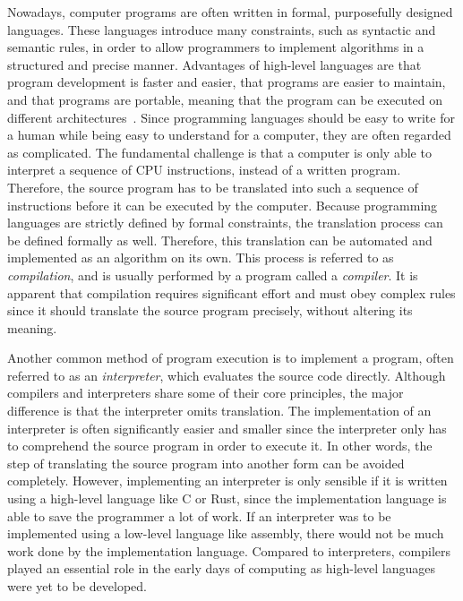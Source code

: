 Nowadays, computer programs are often written in formal, purposefully designed languages.
These languages introduce many constraints, such as syntactic and semantic rules, in order to allow
programmers to implement algorithms in a structured and precise manner.
Advantages of high-level languages are that program development is faster and easier, that programs are easier to maintain, and that programs are portable,
meaning that the program can be executed on different architectures~\cite[p.~9]{Dandamudi2005Risc}.
Since programming languages should be easy to write for a human while being easy to understand for a computer,
they are often regarded as complicated.
The fundamental challenge is that a computer is only able to interpret a sequence of CPU instructions, instead of a written program.
Therefore, the source program has to be translated into such a sequence of instructions before it can be executed by the computer.
Because programming languages are strictly defined by formal constraints, the translation process can be defined formally as well.
Therefore, this translation can be automated and implemented as an algorithm on its own.
This process is referred to as \emph{compilation}, and is usually performed by a program called a \emph{compiler}.
It is apparent that compilation requires significant effort and must obey complex rules
since it should translate the source program precisely, without altering its meaning.

Another common method of program execution is to implement a program, often referred to as an \emph{interpreter}, which evaluates the source code directly.
Although compilers and interpreters share some of their core principles, the major difference is that the interpreter omits translation.
The implementation of an interpreter is often significantly easier and smaller since the interpreter only has to comprehend the source program in order to execute it.
In other words, the step of translating the source program into another form can be avoided completely.
However, implementing an interpreter is only sensible if it is written using a high-level language like C or Rust, since the implementation language is able to save the programmer a lot of work.
If an interpreter was to be implemented using a low-level language like assembly, there would not be much work done by the implementation language.
Compared to interpreters, compilers played an essential role in the early days of computing as high-level languages were yet to be developed.

